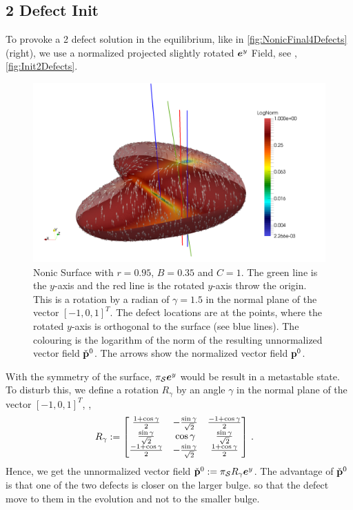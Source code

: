 \documentclass[a4paper,11pt]{scrartcl}
\newcommand{\EuBase}[1]{\eb^{#1}}
\newcommand{\pstretch}{C}
\newcommand{\pprop}{r}
\newcommand{\ppress}{B}
\begin{document}
\subsection{2 Defect Init}
To provoke a 2 defect solution in the equilibrium, like in \autoref{fig:NonicFinal4Defects} (right), 
we use a normalized projected slightly rotated \( \EuBase{y} \) Field, see \eg, \autoref{fig:Init2Defects}.
\begin{figure}
  \centering
  \includegraphics[width=.95\textwidth]{stuff/paraview/Init2Defects.png}
  \caption{Nonic Surface with \( \pprop = 0.95 \), \( \ppress = 0.35 \) and \( \pstretch = 1 \). 
           The green line is the \( y \)-axis and the red line is the rotated \( y \)-axis throw the origin.
           This is a rotation by a radian of \( \gamma = 1.5 \) in the normal plane of the vector 
           \( [-1,0,1]^{T} \).
           The defect locations are at the points, where the rotated \( y \)-axis is orthogonal to the surface (see blue lines).
           The colouring is the logarithm of the norm of the resulting unnormalized vector field \(\check{\mathbf{p}}^{0}\).
           The arrows show the normalized vector field \(\mathbf{p}^{0}\).
           }
  \label{fig:Init2Defects}
\end{figure}
With the symmetry of the surface, \( \ProjectSurf\EuBase{y} \) would be result in a metastable state.
To disturb this, we define a rotation \( R_{\gamma}  \) by an angle \( \gamma \) in the normal plane of the vector \( [-1,0,1]^{T} \),
\ie,
\begin{align}
    R_{\gamma} &:=
      \begin{bmatrix}
        \frac{1+\cos\gamma}{2}      & -\frac{\sin\gamma}{\sqrt{2}}  & \frac{-1+\cos\gamma}{2} \\
        \frac{\sin\gamma}{\sqrt{2}} & \cos\gamma                    & \frac{\sin\gamma}{\sqrt{2}} \\
        \frac{-1+\cos\gamma}{2}     & -\frac{\sin\gamma}{\sqrt{2}}  & \frac{1+\cos\gamma}{2}
      \end{bmatrix} \,\text{.}
\end{align}
Hence, we get the unnormalized vector field \( \check{\pb}^{0} := \ProjectSurf R_{\gamma} \EuBase{y} \).
The advantage of \( \check{\mathbf{p}}^{0} \) is that one of the two defects is closer on the larger bulge.
so that the defect move to them in the evolution and not to the smaller bulge.
\end{document}
